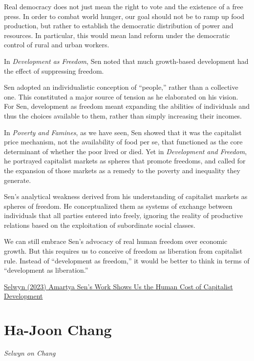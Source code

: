 \documentclass[
]{book}
\begin{document}
Real democracy does not just mean the right to vote and the existence of a free press. In order to combat world hunger, our goal should not be to ramp up food production, but rather to establish the democratic distribution of power and resources. In particular, this would mean land reform under the democratic control of rural and urban workers.

In \emph{Development as Freedom}, Sen noted that much growth-based development had the effect of suppressing freedom.

Sen adopted an individualistic conception of ``people,'' rather than a collective one. This constituted a major source of tension as he elaborated on his vision. For Sen, development as freedom meant expanding the abilities of individuals and thus the choices available to them, rather than simply increasing their incomes.

In \emph{Poverty and Famines}, as we have seen, Sen showed that it was the capitalist price mechanism, not the availability of food per se, that functioned as the core determinant of whether the poor lived or died. Yet in \emph{Development and Freedom}, he portrayed capitalist markets as spheres that promote freedoms, and called for the expansion of those markets as a remedy to the poverty and inequality they generate.

Sen's analytical weakness derived from his understanding of capitalist markets as spheres of freedom. He conceptualized them as systems of exchange between individuals that all parties entered into freely, ignoring the reality of productive relations based on the exploitation of subordinate social classes.

We can still embrace Sen's advocacy of real human freedom over economic growth. But this requires us to conceive of freedom as liberation from capitalist rule. Instead of ``development as freedom,'' it would be better to think in terms of ``development as liberation.''

\href{https://developingeconomics.org/2023/02/10/amartya-sens-work-shows-us-the-human-cost-of-capitalist-development/}{Selwyn (2023) Amartya Sen's Work Shows Us the Human Cost of Capitalist Development}

\hypertarget{ha-joon-chang}{%
\section{Ha-Joon Chang}\label{ha-joon-chang}}

\emph{Selwyn on Chang}
\end{document}
